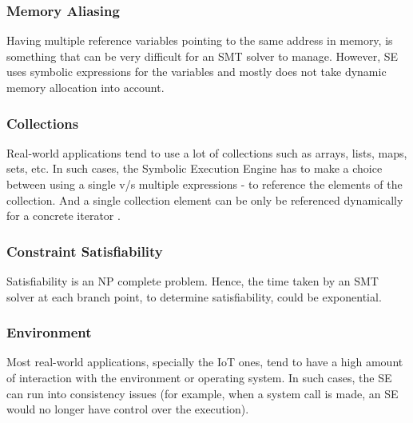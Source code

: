 \documentclass[11pt]{llncs}
\begin{document}
	\subsubsection{Memory Aliasing}

		Having multiple reference variables pointing to the same address in memory, is something that can be very difficult for an SMT solver to manage. However, SE uses symbolic expressions for the variables and mostly does not take dynamic memory allocation into account. \cite{5_Wiki_SE}

	\vspace{-3mm}

	\subsubsection{Collections}

		Real-world applications tend to use a lot of collections such as arrays, lists, maps, sets, etc. In such cases, the Symbolic Execution Engine has to make a choice between using a single v/s multiple expressions - to reference the elements of the collection. And a single collection element can be only be referenced dynamically for a concrete iterator \cite{5_Wiki_SE}.

	\vspace{-3mm}

	\subsubsection{Constraint Satisfiability}

		Satisfiability is an NP complete problem. Hence, the time taken by an SMT solver at each branch point, to determine satisfiability, could be exponential.

	\vspace{-3mm}

	\subsubsection{Environment}

		Most real-world applications, specially the IoT ones, tend to have a high amount of interaction with the environment or operating system. In such cases, the SE can run into consistency issues (for example, when a system call is made, an SE would no longer have control over the execution). \cite{5_Wiki_SE}

	\vspace{5mm}
\end{document}
